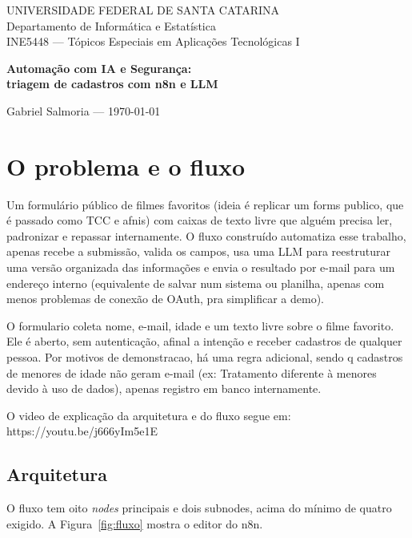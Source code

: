 \documentclass[article,11pt,oneside,a4paper,brazil,section=TITLE]{abntex2}
\begin{document}
\textual

\begin{center}
  {\small
    UNIVERSIDADE FEDERAL DE SANTA CATARINA\\
    Departamento de Informática e Estatística\\
    INE5448 --- Tópicos Especiais em Aplicações Tecnológicas I\par}
  \vspace{1.2em}
  {\bfseries\large Automação com IA e Segurança:\\
   triagem de cadastros com n8n e LLM\par}
  \vspace{0.8em}
  {Gabriel Salmoria \quad --- \quad \today\par}
\end{center}
\vspace{1em}

\section{O problema e o fluxo}

Um formulário público de filmes favoritos (ideia é replicar um forms publico, que é passado como TCC e afnis) com caixas de texto livre que alguém precisa ler, padronizar e repassar internamente. O fluxo construído automatiza esse trabalho, apenas recebe a submissão, valida os campos, usa uma LLM para reestruturar uma versão organizada das informações e envia o resultado por e-mail para um endereço interno (equivalente de salvar num sistema ou planilha, apenas com menos problemas de conexão de OAuth, pra simplificar a demo).

O formulario coleta nome, e-mail, idade e um texto livre sobre o filme favorito. Ele é aberto, sem autenticação, afinal a intenção e receber cadastros de qualquer pessoa. Por motivos de demonstracao, há uma regra adicional, sendo q cadastros de menores de idade não geram e-mail (ex: Tratamento diferente à menores devido à uso de dados), apenas registro em banco internamente.

O video de explicação da arquitetura e do fluxo segue em: https://youtu.be/j666yIm5e1E

\subsection{Arquitetura}

O fluxo tem oito \emph{nodes} principais e dois subnodes, acima do mínimo de
quatro exigido. A Figura~\ref{fig:fluxo} mostra o editor do n8n.
\end{document}
